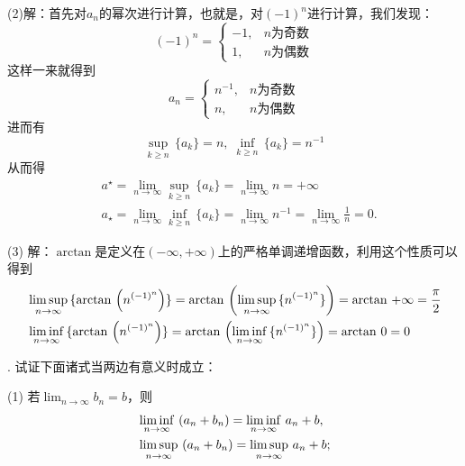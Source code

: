 \noindent (2)解：首先对$a_n$的幂次进行计算，也就是，对$(-1)^n$进行计算，我们发现：
\begin{equation}
    (-1)^n = \begin{cases}
        -1, & n\text{为奇数} \\
        1, & n\text{为偶数}
    \end{cases}
\end{equation}
这样一来就得到
\begin{equation}
    a_n = \begin{cases}
        n^{-1}, & n\text{为奇数} \\
        n, & n\text{为偶数}
    \end{cases}
\end{equation}
进而有
\begin{equation}
    \sup_{k \geq n} \, \{ a_k \} = n, \; \inf_{k \geq n} \, \{ a_k \} = n^{-1}
\end{equation}
从而得
\begin{align}
    &a^\star = \lim_{n\to\infty} \sup_{k \geq n} \, \{ a_k \} = \lim_{n \to \infty} n = +\infty \\
    &a_\star = \lim_{n\to\infty} \inf_{k \geq n} \, \{ a_k \} = \lim_{n \to \infty} n^{-1} = \lim_{n \to \infty} \frac{1}{n} = 0.
\end{align}

\noindent (3) 解：$\arctan$是定义在$(-\infty, +\infty)$上的严格单调递增函数，利用这个性质可以得到
\begin{align}
    &\mathop{\underset{n \to \infty}{\lim \sup}} \, \{ \arctan \, \left(n^{(-1)^n}\right) \} = \arctan \, \left( \mathop{\underset{n \to \infty}{\lim \sup}} \, \{ n^{(-1)^n}\}\right) = \arctan \, +\infty = \frac{\pi}{2} \\
    &\mathop{\underset{n \to \infty}{\lim \inf}} \, \{ \arctan \, \left(n^{(-1)^n}\right) \} = \arctan \, \left( \mathop{\underset{n \to \infty}{\lim \inf}} \, \{ n^{(-1)^n}\}\right) = \arctan \, 0 = 0
\end{align}

. 试证下面诸式当两边有意义时成立：

\noindent (1) 若$\displaystyle\lim_{n\to\infty}b_n=b$，则
\begin{align}
    &\mathop{\underset{n \to \infty}{\lim \inf}} \, \left( a_n + b_n \right) = \mathop{\underset{n \to \infty}{\lim \inf}} \, a_n + b, \\
    &\mathop{\underset{n \to \infty}{\lim \sup}} \, \left( a_n + b_n \right) = \mathop{\underset{n \to \infty}{\lim \sup}} \, a_n + b;
\end{align}

